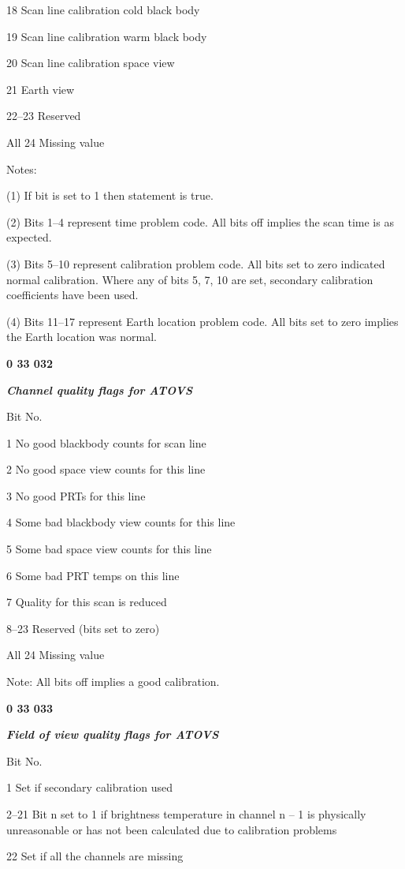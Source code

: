18 Scan line calibration cold black body

19 Scan line calibration warm black body

20 Scan line calibration space view

21 Earth view

22--23 Reserved

All 24 Missing value

Notes:

(1) If bit is set to 1 then statement is true.

(2) Bits 1--4 represent time problem code. All bits off implies the scan time is as expected.

(3) Bits 5--10 represent calibration problem code. All bits set to zero indicated normal calibration. Where any of bits 5, 7, 10 are set, secondary calibration coefficients have been used.

(4) Bits 11--17 represent Earth location problem code. All bits set to zero implies the Earth location was normal.

\textbf{0 33 032}

\emph{\textbf{Channel quality flags for ATOVS}}

Bit No.

1 No good blackbody counts for scan line

2 No good space view counts for this line

3 No good PRTs for this line

4 Some bad blackbody view counts for this line

5 Some bad space view counts for this line

6 Some bad PRT temps on this line

7 Quality for this scan is reduced

8--23 Reserved (bits set to zero)

All 24 Missing value

Note: All bits off implies a good calibration.

\textbf{0 33 033}

\emph{\textbf{Field of view quality flags for ATOVS}}

Bit No.

1 Set if secondary calibration used

2--21 Bit n set to 1 if brightness temperature in channel n -- 1 is physically unreasonable or has not been calculated due to calibration problems

22 Set if all the channels are missing

